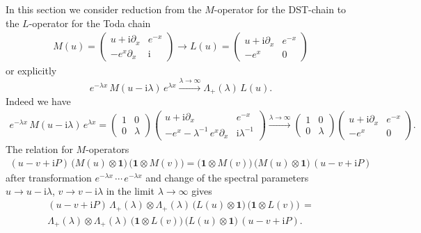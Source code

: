 \documentclass[11pt]{article}
\numberwithin{equation}{section}
\theoremstyle{plain}
\theoremstyle{definition}
\renewcommand{\imath}{\mathrm{i}}
\begin{document}
In this section we consider reduction 
from the $M$-operator for the DST-chain to 
the $L$-operator for the Toda chain
\begin{align*}
	M(u) = 
	\begin{pmatrix}
		u + \imath \partial_{x} & e^{-x} \\[4pt]
		-e^{x} \partial_{x} & \imath
	\end{pmatrix} \longrightarrow 
	L(u) = 
	\begin{pmatrix}
		u + \imath \partial_{x} & e^{-x} \\[4pt]
		-e^{x} & 0
	\end{pmatrix}
\end{align*}
or explicitly 
\begin{equation} \label{asymptML}
	e^{-\lambda x}\,M(u-\imath\lambda)\,e^{\lambda x}  
	\xrightarrow{\lambda\to\infty} 
	\Lambda_{+}(\lambda)\, L(u).
\end{equation}
Indeed we have 
\begin{align*}
	e^{-\lambda x}\,M(u-\imath\lambda)\,e^{\lambda x}  
	= \begin{pmatrix}
		1 & 0 \\[4pt]
		0 & \lambda
	\end{pmatrix} 
	\begin{pmatrix}
		u + \imath \partial_{x} & e^{-x} \\[4pt]
		-e^{x}-\lambda^{-1}\,e^{x} \partial_{x} & \imath \lambda^{-1}
	\end{pmatrix} \xrightarrow{\lambda \to \infty} 
	\begin{pmatrix}
		1 & 0 \\[4pt]
		0 & \lambda
	\end{pmatrix}  
	\begin{pmatrix}
		u + \imath \partial_{x} & e^{-x} \\[4pt]
		-e^{x} & 0
	\end{pmatrix}.
\end{align*} 
The relation for $M$-operators 
\begin{align*}
	\textstyle \left(u-v  + \imath P\right)\, \bigl(M(u)\otimes \bm{1}\bigr)\, 
	\bigl(\bm{1} \otimes M(v)\bigr)
	=  
	\bigl(\bm{1} \otimes M(v)\bigr)\,
	\bigl(M(u)\otimes \bm{1}\bigr)\, \left(u-v  + \imath P\right)
\end{align*}
after transformation $e^{-\lambda x}\,\cdots\,e^{-\lambda x}$ and 
change of the spectral parameters $u \to u -\imath\lambda$, $v \to v -\imath\lambda$
in the limit $\lambda \to \infty$ gives
\begin{align*}
	\textstyle \left(u-v  + \imath P\right)\,
	\Lambda_{+}(\lambda)\otimes\Lambda_{+}(\lambda)\, 
	\bigl(L(u)\otimes \bm{1}\bigr)\, 
	\bigl(\bm{1} \otimes L(v)\bigr)\, 
	= \\[6pt] 
	\textstyle \Lambda_{+}(\lambda)\otimes\Lambda_{+}(\lambda)\,
	\bigl(\bm{1} \otimes L(v)\bigr)\,
	\bigl(L(u)\otimes \bm{1}\bigr)\,\left(u-v  +\imath P\right).
\end{align*}
\end{document}
